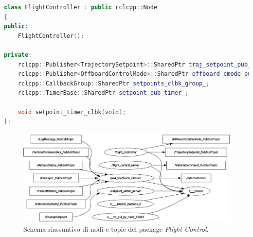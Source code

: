 \begin{lstlisting}[language={C++}, caption={Definizione del nodo \emph{flight\_controller}.}, label={lst:fcontroller}]
class FlightController : public rclcpp::Node
{
public:
    FlightController();

private:
    rclcpp::Publisher<TrajectorySetpoint>::SharedPtr traj_setpoint_pub_;
    rclcpp::Publisher<OffboardControlMode>::SharedPtr offboard_cmode_pub_;
    rclcpp::CallbackGroup::SharedPtr setpoints_clbk_group_;
    rclcpp::TimerBase::SharedPtr setpoint_pub_timer_;

    void setpoint_timer_clbk(void);
};
\end{lstlisting}

\vspace{3cm}

\begin{figure}[h!]
    \centering
    \includegraphics[width=\textwidth]{figs/chapter3/fctrl.png}
    \caption{Schema riassuntivo di nodi e topic del package \emph{Flight Control}.}
    \label{fig:fctrl}
\end{figure}
\clearpage

